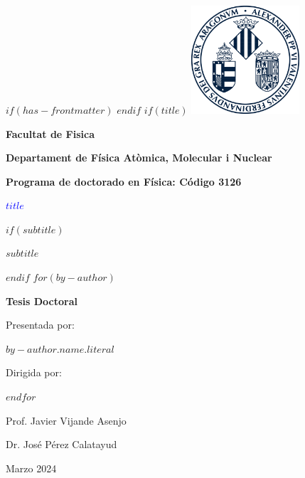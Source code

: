 $if(has-frontmatter)$
\frontmatter
$endif$
$if(title)$
\thispagestyle{empty}
\centering
\vspace*{-2cm} %
\includegraphics[width=0.3\textwidth]{escudouv} %


{\Large\bfseries Facultat de Fisica \par}
{\Large\bfseries Departament de Física Atòmica, Molecular i Nuclear \par}
{\Large\bfseries Programa de doctorado en Física: Código 3126 \par}

\vspace*{1cm}
{\textcolor{blue}{\Huge\bfseries $title$} \par}

\vspace*{5mm}
$if(subtitle)$
\vspace{3ex}
{\Large\bfseries $subtitle$ \par}
$endif$
\vspace{3ex}
$for(by-author)$
{\Large\bfseries Tesis Doctoral \par}
{\large Presentada por: \par}
{\large $by-author.name.literal$ \par}
{\large Dirigida por: \par}
\vspace{3ex}
$endfor$%
\begin{minipage}[t]{0.4\textwidth}
    \centering
    {\large Prof. Javier Vijande Asenjo \par}
\end{minipage}
\hfill
\begin{minipage}[t]{0.4\textwidth}
    \centering
    {\large Dr. José Pérez Calatayud \par}
\end{minipage}


\vspace*{4cm}
{\large Marzo 2024 \par}
\vfill %

